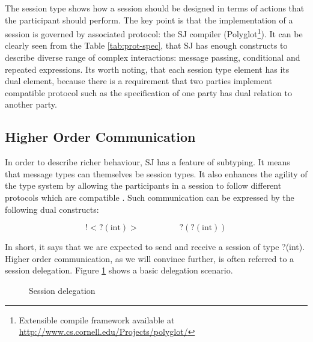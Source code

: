 \documentclass[a4paper]{easychair}
\begin{document}
The session type shows how a session should be designed in terms of actions that the participant should perform. The key point is that the implementation of a session is governed by associated protocol: the SJ compiler (Polyglot\footnote{Extensible compile framework available at \url{http://www.cs.cornell.edu/Projects/polyglot/}}). It can be clearly seen from the Table \ref{tab:prot-spec}, that SJ has enough constructs to describe diverse range of complex interactions: message passing, conditional and repeated expressions. Its worth noting, that each session type element has its dual element, because there is a requirement that two parties implement compatible protocol such as the specification of one party has dual relation to another party.

\subsection{Higher Order Communication}
In order to describe richer behaviour, SJ has a feature of subtyping. It means that message types can themselves be session types. It also enhances the agility of the type system by allowing the participants in a session to follow different protocols which are compatible \cite{higher-order-comm}. Such communication can be expressed by the following dual constructs:

\begin{equation*}
!<?(\text{int})> \hspace{2cm} ?(?(\text{int}))
\end{equation*}

In short, it says that we are expected to send and receive a session of type ?(int). Higher order communication, as we will convince further, is often referred to a session delegation. Figure \ref{fig:sj-delegation} shows a basic delegation scenario.

\begin{figure}[ht]
\centering
{}
\caption{Session delegation}\label{fig:sj-delegation}
\end{figure}
\end{document}
